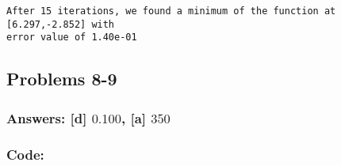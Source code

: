 \documentclass[11pt]{article}
\begin{document}
    \begin{Verbatim}[commandchars=\\\{\}]
After 15 iterations, we found a minimum of the function at [6.297,-2.852] with
error value of 1.40e-01
    \end{Verbatim}

    \hypertarget{problems-8-9}{%
\subsection{Problems 8-9}\label{problems-8-9}}

\hypertarget{answers-d-0.100-a-350}{%
\subsubsection{\texorpdfstring{Answers: {[}d{]} \(0.100\), {[}a{]}
\(350\)}{Answers: {[}d{]} 0.100, {[}a{]} 350}}\label{answers-d-0.100-a-350}}

\hypertarget{code}{%
\subsubsection{Code:}\label{code}}
\end{document}
